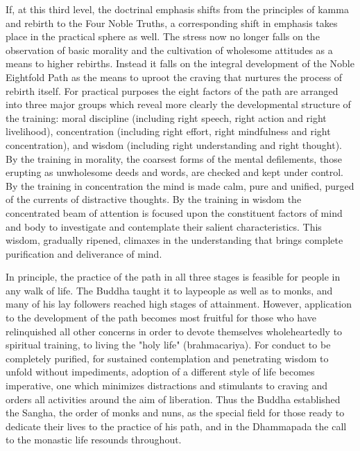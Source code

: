 \begin{enumerate}[i]
If, at this third level, the doctrinal emphasis shifts from the principles of kamma and rebirth to the Four Noble Truths, a corresponding shift in emphasis takes place in the practical sphere as well. The stress now no longer falls on the observation of basic morality and the cultivation of wholesome attitudes as a means to higher rebirths. Instead it falls on the integral development of the Noble Eightfold Path as the means to uproot the craving that nurtures the process of rebirth itself. For practical purposes the eight factors of the path are arranged into three major groups which reveal more clearly the developmental structure of the training: moral discipline (including right speech, right action and right livelihood), concentration (including right effort, right mindfulness and right concentration), and wisdom (including right understanding and right thought). By the training in morality, the coarsest forms of the mental defilements, those erupting as unwholesome deeds and words, are checked and kept under control. By the training in concentration the mind is made calm, pure and unified, purged of the currents of distractive thoughts. By the training in wisdom the concentrated beam of attention is focused upon the constituent factors of mind and body to investigate and contemplate their salient characteristics. This wisdom, gradually ripened, climaxes in the understanding that brings complete purification and deliverance of mind.

In principle, the practice of the path in all three stages is feasible for people in any walk of life. The Buddha taught it to laypeople as well as to monks, and many of his lay followers reached high stages of attainment. However, application to the development of the path becomes most fruitful for those who have relinquished all other concerns in order to devote themselves wholeheartedly to spiritual training, to living the "holy life" (brahmacariya). For conduct to be completely purified, for sustained contemplation and penetrating wisdom to unfold without impediments, adoption of a different style of life becomes imperative, one which minimizes distractions and stimulants to craving and orders all activities around the aim of liberation. Thus the Buddha established the Sangha, the order of monks and nuns, as the special field for those ready to dedicate their lives to the practice of his path, and in the Dhammapada the call to the monastic life resounds throughout.


\end{enumerate}

